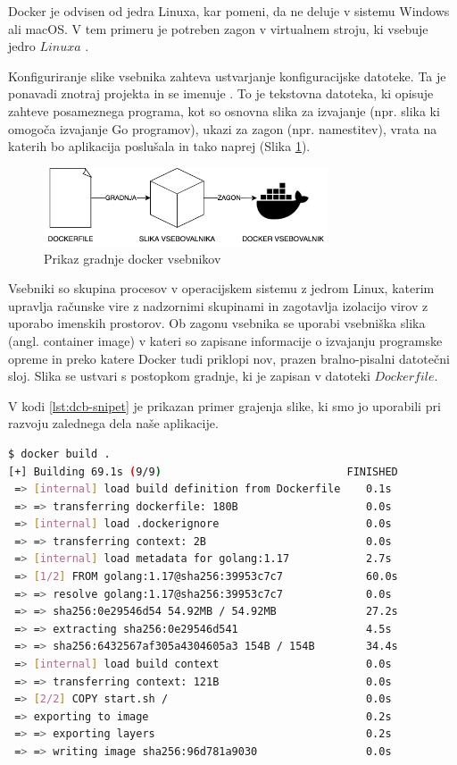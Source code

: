 \documentclass[a4paper, 12pt]{book}
\begin{document}
Docker je odvisen od jedra Linuxa, kar pomeni, da ne deluje v sistemu Windows ali macOS. V tem primeru je potreben zagon v virtualnem stroju, ki vsebuje jedro $Linuxa$ \cite{docker-in-action}.

Konfiguriranje slike vsebnika zahteva ustvarjanje konfiguracijske datoteke. Ta je ponavadi znotraj projekta in se imenuje . To je tekstovna datoteka, ki opisuje zahteve posameznega programa, kot so osnovna slika za izvajanje (npr. slika ki omogoča izvajanje Go programov), ukazi za zagon (npr. namestitev), vrata na katerih bo aplikacija poslušala in tako naprej (Slika \ref{docker-flow}).

\begin{figure}[h]
\begin{center}
\includegraphics[width=0.75\textwidth]{slike/docker-flow.png}
\end{center}
\caption{ Prikaz gradnje docker vsebnikov }
\label{docker-flow}
\end{figure}

Vsebniki so skupina procesov v operacijskem sistemu z jedrom Linux, katerim upravlja računske vire z nadzornimi skupinami in zagotavlja izolacijo virov z uporabo imenskih prostorov. Ob zagonu vsebnika se uporabi vsebniška slika (angl. container image) v kateri so zapisane informacije o izvajanju programske opreme in preko katere Docker tudi priklopi nov, prazen bralno-pisalni datotečni sloj. Slika se ustvari s postopkom gradnje, ki je zapisan v datoteki $Dockerfile$. 

V kodi \ref{lst:dcb-snipet} je prikazan primer grajenja slike, ki smo jo uporabili pri razvoju zalednega dela naše aplikacije.
\begin{lstlisting}[language=bash, style=mystyle,caption={Grajenje slike docker vmestnika},label=lst:dcb-snipet]
$ docker build .          
[+] Building 69.1s (9/9)                             FINISHED
 => [internal] load build definition from Dockerfile    0.1s
 => => transferring dockerfile: 180B                    0.0s
 => [internal] load .dockerignore                       0.0s
 => => transferring context: 2B                         0.0s
 => [internal] load metadata for golang:1.17            2.7s
 => [1/2] FROM golang:1.17@sha256:39953c7c7             60.0s
 => => resolve golang:1.17@sha256:39953c7c7             0.0s
 => => sha256:0e29546d54 54.92MB / 54.92MB              27.2s
 => => extracting sha256:0e29546d541                    4.5s
 => => sha256:6432567af305a4304605a3 154B / 154B        34.4s
 => [internal] load build context                       0.0s
 => => transferring context: 121B                       0.0s
 => [2/2] COPY start.sh /                               0.0s 
 => exporting to image                                  0.2s 
 => => exporting layers                                 0.2s 
 => => writing image sha256:96d781a9030                 0.0s 
\end{lstlisting}
\end{document}
